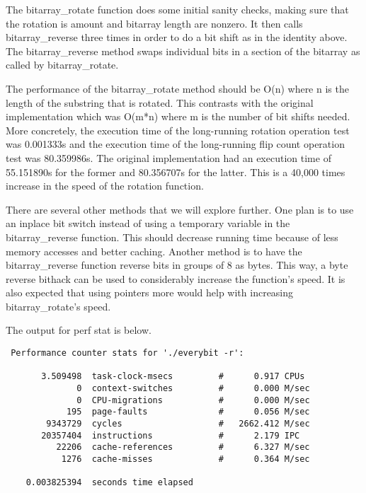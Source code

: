 \documentclass[12pt]{article}
\begin{document}
The bitarray_rotate function does some initial sanity checks, making sure that 
the rotation is amount and bitarray length are nonzero.  It then calls 
bitarray_reverse three times in order to do a bit shift as in the identity 
above.  The bitarray_reverse method swaps individual bits in a section of the 
bitarray as called by bitarray_rotate.  

The performance of the bitarray_rotate method should be O(n) where n is the 
length of the substring that is rotated.  This contrasts with the original 
implementation which was O(m*n) where m is the number of bit shifts needed.  
More concretely, the execution time of the long-running rotation operation test 
was 0.001333s and the execution time of the long-running flip count operation 
test was 80.359986s.  The original implementation had an execution time of 
55.151890s for the former and 80.356707s for the latter.  This is a 40,000 times 
increase in the speed of the rotation function.  

There are several other methods that we will explore further.  One plan is to 
use an inplace bit switch instead of using a temporary variable in the 
bitarray_reverse function.  This should decrease running time because of less 
memory accesses and better caching.  Another method is to have the 
bitarray_reverse function reverse bits in groups of 8 as bytes.  This way, a 
byte reverse bithack can be used to considerably increase the function's speed.  
It is also expected that using pointers more would help with increasing 
bitarray_rotate's speed.  

The output for perf stat is below.  
\begin{verbatim}
 Performance counter stats for './everybit -r':

       3.509498  task-clock-msecs         #      0.917 CPUs 
              0  context-switches         #      0.000 M/sec
              0  CPU-migrations           #      0.000 M/sec
            195  page-faults              #      0.056 M/sec
        9343729  cycles                   #   2662.412 M/sec
       20357404  instructions             #      2.179 IPC  
          22206  cache-references         #      6.327 M/sec
           1276  cache-misses             #      0.364 M/sec

    0.003825394  seconds time elapsed
\end{verbatim}
\end{document}

